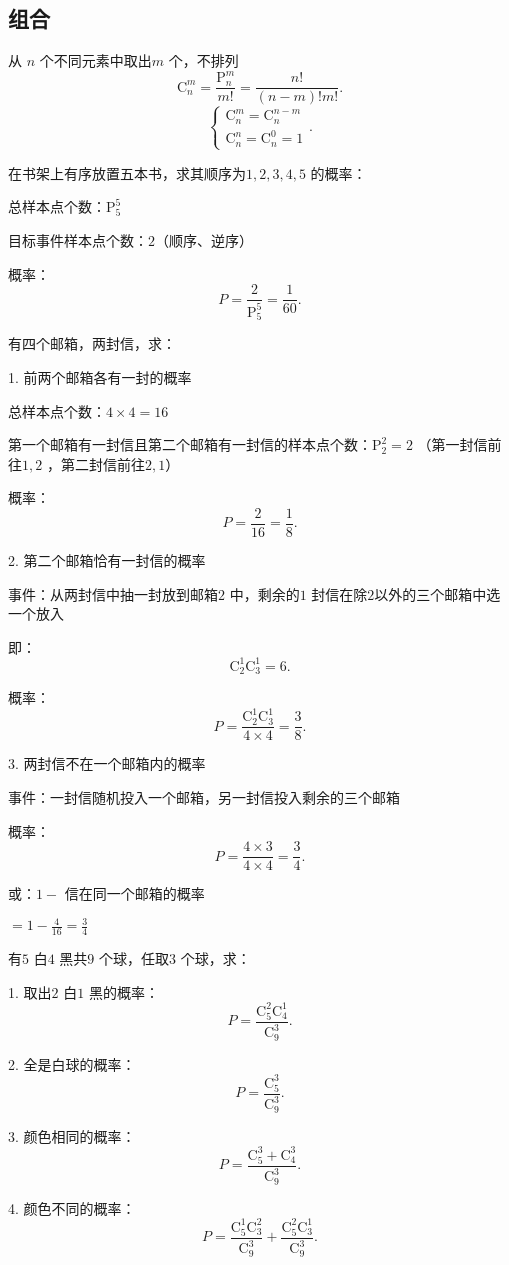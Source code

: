 \subsection{组合}%
\label{sub:组合}
从 $n$ 个不同元素中取出$m$ 个，不排列
\[
    \mathrm{C}_n^m=\frac{\mathrm{P}_n^m}{m!}=\frac{n!}{\left( n-m \right)! m!}
.\] 
\[
    \begin{cases}
        \mathrm{C}_{n}^{m}=\mathrm{C}_{n}^{n-m}\\
        \mathrm{C}_{n}^{n}=\mathrm{C}_{n}^{0}=1
    \end{cases}
.\] 
\begin{eg}
    在书架上有序放置五本书，求其顺序为$1,2,3,4,5$ 的概率：

    总样本点个数：$\mathrm{P}_{5}^{5}$

    目标事件样本点个数：$2$（顺序、逆序）

    概率： \[
        P=\frac{2}{\mathrm{P}_{5}^{5}}= \frac{1}{60}
    .\] 
\end{eg}
\begin{eg}
    有四个邮箱，两封信，求：

    1. 前两个邮箱各有一封的概率

    总样本点个数：$4\times 4=16$ 

    第一个邮箱有一封信且第二个邮箱有一封信的样本点个数：$\mathrm{P}_{2}^{2}=2$ （第一封信前往$1,2$ ，第二封信前往$2,1$）

    概率：\[
        P=\frac{2}{16}=\frac{1}{8}
    .\] 

    2. 第二个邮箱恰有一封信的概率

    事件：从两封信中抽一封放到邮箱$2$ 中，剩余的$1$ 封信在除$2$以外的三个邮箱中选一个放入

    即：\[
        \mathrm{C}_{2}^{1}\mathrm{C}_{3}^{1}=6
    .\] 

    概率：\[
        P=\frac{\mathrm{C}_{2}^{1}\mathrm{C}_{3}^{1}}{4\times 4}=\frac{3}{8}
    .\] 

    3. 两封信不在一个邮箱内的概率

    事件：一封信随机投入一个邮箱，另一封信投入剩余的三个邮箱

    概率：
    \[
        P=\frac{4\times 3}{4\times 4}=\frac{3}{4}
    .\] 
    
    或：$1-$ 信在同一个邮箱的概率

    ${=1-\frac{4}{16}=\frac{3}{4}}$
\end{eg}
\begin{eg}
    有$5$ 白$4$ 黑共$9$ 个球，任取$3$ 个球，求：

    1. 取出$2$ 白$1$ 黑的概率：\[
        P=\frac{\mathrm{C}_{5}^{2}\mathrm{C}_{4}^{1}}{\mathrm{C}_{9}^{3}}
    .\] 

    2. 全是白球的概率：\[
        P=\frac{\mathrm{C}_{5}^{3}}{\mathrm{C}_{9}^{3}}
    .\] 

    3. 颜色相同的概率：\[
        P=\frac{\mathrm{C}_{5}^{3}+\mathrm{C}_{4}^{3}}{\mathrm{C}_{9}^{3}}
    .\] 

    4. 颜色不同的概率：\[
        P=\frac{\mathrm{C}_{5}^{1}\mathrm{C}_{3}^{2}}{\mathrm{C}_{9}^{3}}+\frac{\mathrm{C}_{5}^{2}\mathrm{C}_{3}^{1}}{\mathrm{C}_{9}^{3}}
    .\] 
\end{eg}
